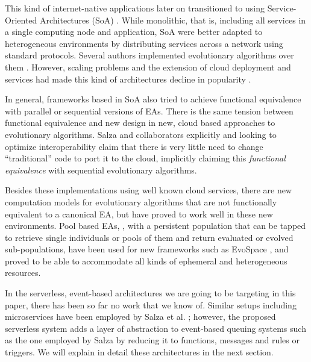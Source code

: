 \documentclass{llncs}
\begin{document}
  This kind of internet-native applications later on transitioned to
  using Service-Oriented Architectures (SoA) \cite{Papazoglou2007}. While monolithic, that is,
  including all services in a single computing node and application, SoA
  were better adapted to heterogeneous environments by distributing
  services across a network using standard protocols. Several authors
  implemented evolutionary algorithms over them
  \cite{garcia2013service,munawar2010design,6955331}. However, scaling
  problems and the extension of cloud deployment and services had made
  this kind of architectures decline in popularity
  \cite{Varghese2018849}.

  In general, frameworks based in SoA also tried to achieve functional equivalence with parallel
  or sequential versions of EAs. There is the same tension between
  functional equivalence and new
  design in new, cloud based approaches to evolutionary
  algorithms. 
  Salza and collaborators \cite{salza2017ccube,de2017parallel} explicitly
  and looking to optimize interoperability claim that there is very
  little need to change ``traditional'' code to port it to the cloud,
  implicitly claiming this {\em functional equivalence} with
  sequential evolutionary algorithms.

  Besides these implementations using well known cloud services, there are new computation models for evolutionary algorithms
  that are not functionally equivalent to a canonical EA, but have
  proved to work well in these new environments. Pool based EAs,
  \cite{bollini1999distributed}, with a persistent population that can
  be tapped to retrieve single individuals or pools of them and return
  evaluated or evolved sub-populations, have been used for new
  frameworks such as EvoSpace \cite{García-Valdez2015}, and proved to be
  able to accommodate all kinds of ephemeral and heterogeneous
  resources.

  In the serverless, event-based architectures we are going to
  be targeting in this paper, there has been so far no work that we know
  of. Similar setups including microservices have been employed by Salza et
  al. \cite{salza2017ccube}; however, the proposed serverless system adds a layer of abstraction to event-based queuing systems such as the one employed
  by Salza by reducing it to functions, messages and rules or
  triggers. We will explain in detail these architectures in the next
  section.
\end{document}

